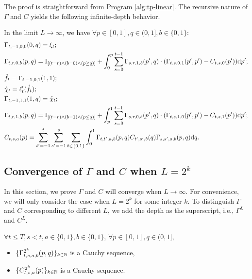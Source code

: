 \documentclass{article}
\theoremstyle{plain}
\theoremstyle{definition}
\begin{document}
The proof is straightforward from Program \ref{alg:tp-linear}. The recursive nature of $\Gamma$ and $C$ yields the following infinite-depth behavior.

\begin{prop} \label{prop:infinite_depth_linear_formal}
In the limit $L\to \infty$, we  have $\forall p\in [0, 1], q\in (0,1], b\in\{0, 1\}$:
\begin{align*}
    & \Gamma_{t,-1,0,0}(0, q)=\xi_t; \\
  & \Gamma_{t,r,0,b}(p, q)=\mathbb{I}_{[(t=r) \wedge (b=0) \wedge (p\geq q)]} + \int_0^p \sum_{s=0}^{t-1}\Gamma_{s,r,1,b}(p',q)\cdot (\Gamma_{t,s,0,1}(p', p')- C_{t,s,0}(p'))\mathrm{d} p'; \\
     & \mathring f_t = \Gamma_{t,-1,0,1}(1, 1);\\
     & \mathring \chi_t = \ell'_t(\mathring f_t); \\
     & \Gamma_{t,-1,1,1}(1,q)=\mathring \chi_t; \\
     & \Gamma_{t,r,1,b}(p, q) = \mathbb{I}_{[(t=r) \wedge (b=1) \wedge (p\leq q)]} + \int_p^1 \sum_{s=0}^{t-1} \Gamma_{s,r,0,b}(p',q) \cdot (\Gamma_{t,s,1,0}(p',p') - C_{t,s,1}(p'))\mathrm{d} p';\\
     & C_{t,s,a}(p)=\sum_{t'=-1}^{t}\sum_{s'=-1}^{s}\sum_{b\in\{0,1\}}\int_0^1 \Gamma_{t,t',a,b}(p,q) C_{t',s',b}(q)\Gamma_{s,s',a,b}(p,q) \mathrm{d} q.
\end{align*}
\end{prop}

\subsection{Convergence of $\Gamma$ and $C$ when $L=2^k$}

In this section, we prove $\Gamma$ and $C$ will converge when $L\to\infty$. For convenience, we will only consider the case when $L=2^k$ for some integer $k$. To distinguish $\Gamma$ and $C$ corresponding to different $L$, we add the depth as the superscript, i.e., $\Gamma^L$ and $C^L$.

\begin{thm}
    $\forall t\leq T,s<t, a\in \{0,1\}, b\in \{0, 1\}$, $\forall p\in [0, 1], q\in (0,1]$, 
    \begin{itemize}
        \item $\{\Gamma^{2^k}_{t,s,a,b}(p,q)\}_{k\in \mathbb{N}}$ is a Cauchy sequence, 
        \item $\{C^{2^k}_{t,s,a}(p)\}_{k\in \mathbb{N}}$ is a Cauchy sequence.
    \end{itemize}
\end{thm}
\end{document}
